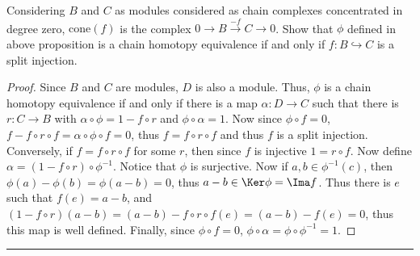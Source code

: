 \begin{exer} Considering $B$ and $C$ as modules considered as chain complexes concentrated in degree zero, $\mathrm{cone}(f)$ is the complex $0\rightarrow B\xrightarrow{-f} C\rightarrow 0$. Show that $\phi$ defined in above proposition is a chain homotopy equivalence if and only if $f:B\hookrightarrow C$ is a split injection.
\end{exer}
\begin{proof}
Since $B$ and $C$ are modules, $D$ is also a module. Thus, $\phi$ is a chain homotopy equivalence if and only if there is a map $\alpha:D\rightarrow C$ such that there is $r:C\rightarrow B$ with $\alpha\circ \phi=1-f\circ r$ and $\phi\circ \alpha=1$. Now since $\phi\circ f=0$, $f-f\circ r\circ f=\alpha\circ \phi\circ f=0$, thus $f=f\circ r\circ f$ and thus $f$ is a split injection. Conversely, if $f=f\circ r\circ f$ for some $r$, then since $f$ is injective $1=r\circ f$. Now define $\alpha=(1-f\circ r)\circ \phi^{-1}$. Notice that $\phi$ is surjective. Now if $a,b\in \phi^{-1}(c)$, then $\phi(a)-\phi(b)=\phi(a-b)=0$, thus $a-b\in \Ker\phi=\Ima f$. Thus there is $e$ such that $f(e)=a-b$, and $(1-f\circ r)(a-b)=(a-b)-f\circ r\circ f(e)=(a-b)-f(e)=0$, thus this map is well defined. Finally, since $\phi\circ f=0$, $\phi\circ \alpha=\phi\circ \phi^{-1}=1$.
\end{proof}
\noindent\rule{\textwidth}{1pt}
\newline